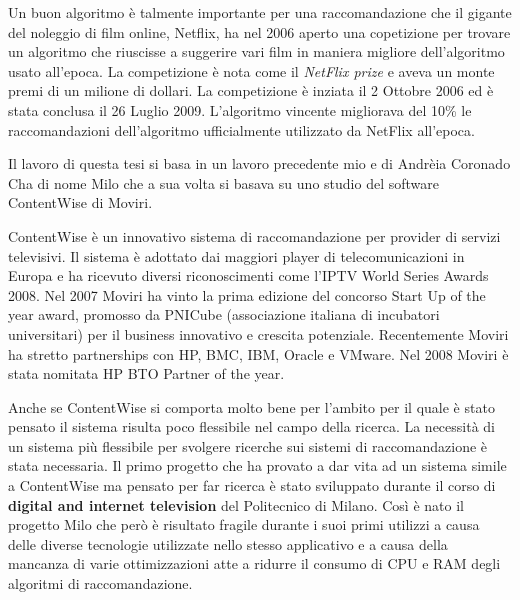 Un buon algoritmo è talmente importante per una raccomandazione che il gigante del noleggio di film online, Netflix, ha nel 2006 aperto una copetizione per trovare un algoritmo che riuscisse a suggerire vari film in maniera migliore dell'algoritmo usato all'epoca. La competizione è nota come il \textit{NetFlix prize} \cite{netflixprize} e aveva un monte premi di un milione di dollari. La competizione è inziata il 2 Ottobre 2006 ed è stata conclusa il 26 Luglio 2009. L'algoritmo vincente migliorava del 10\% le raccomandazioni dell'algoritmo ufficialmente utilizzato da NetFlix all'epoca.

Il lavoro di questa tesi si basa in un lavoro precedente mio e di Andrèia Coronado Cha di nome Milo che a sua volta si basava su uno studio del software ContentWise \cite{ContentWise} di Moviri.

ContentWise è un innovativo sistema di raccomandazione per provider di servizi televisivi. Il sistema è adottato dai maggiori player di telecomunicazioni in Europa e ha ricevuto diversi riconoscimenti come l'IPTV World Series Awards 2008. Nel 2007 Moviri ha vinto la prima edizione del concorso Start Up of the year award, promosso da PNICube (associazione italiana di incubatori universitari) per il business innovativo e crescita potenziale. Recentemente Moviri ha stretto partnerships con HP, BMC, IBM, Oracle e VMware. Nel 2008 Moviri è stata nomitata HP BTO Partner of the year.

Anche se ContentWise si comporta molto bene per l'ambito per il quale è stato pensato il sistema risulta poco flessibile nel campo della ricerca. La necessità di un sistema pi\`u flessibile per svolgere ricerche sui sistemi di raccomandazione \`e stata necessaria. Il primo progetto che ha provato a dar vita ad un sistema simile a ContentWise ma pensato per far ricerca \`e stato sviluppato durante il corso di \textbf{digital and internet television} del Politecnico di Milano. Cos\`i \`e nato il progetto Milo che per\`o \`e risultato fragile durante i suoi primi utilizzi a causa delle diverse tecnologie utilizzate nello stesso applicativo e a causa della mancanza di varie ottimizzazioni atte a ridurre il consumo di CPU e RAM degli algoritmi di raccomandazione.

